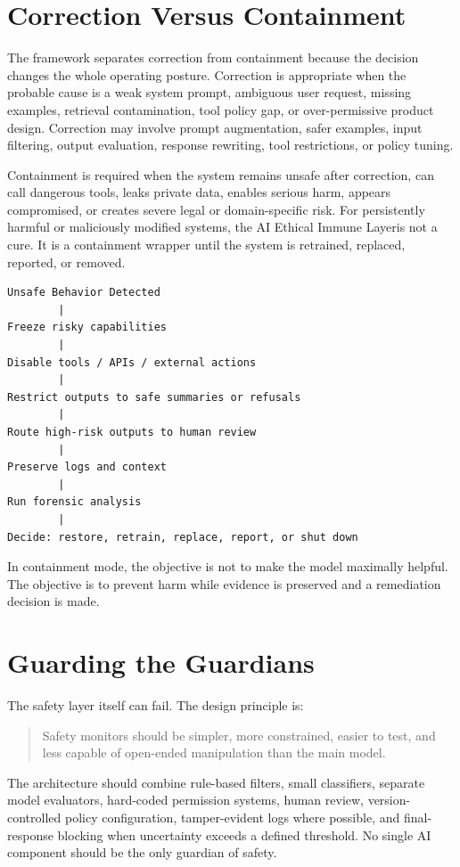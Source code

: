 \documentclass[11pt]{article}
\newcommand{\AEIL}{AI Ethical Immune Layer}
\begin{document}
\section{Correction Versus Containment}

The framework separates correction from containment because the decision changes the whole operating posture. Correction is appropriate when the probable cause is a weak system prompt, ambiguous user request, missing examples, retrieval contamination, tool policy gap, or over-permissive product design. Correction may involve prompt augmentation, safer examples, input filtering, output evaluation, response rewriting, tool restrictions, or policy tuning.

Containment is required when the system remains unsafe after correction, can call dangerous tools, leaks private data, enables serious harm, appears compromised, or creates severe legal or domain-specific risk. For persistently harmful or maliciously modified systems, the \AEIL is not a cure. It is a containment wrapper until the system is retrained, replaced, reported, or removed.

\begin{verbatim}
Unsafe Behavior Detected
        |
Freeze risky capabilities
        |
Disable tools / APIs / external actions
        |
Restrict outputs to safe summaries or refusals
        |
Route high-risk outputs to human review
        |
Preserve logs and context
        |
Run forensic analysis
        |
Decide: restore, retrain, replace, report, or shut down
\end{verbatim}

In containment mode, the objective is not to make the model maximally helpful. The objective is to prevent harm while evidence is preserved and a remediation decision is made.

\section{Guarding the Guardians}

The safety layer itself can fail. The design principle is:

\begin{quote}
Safety monitors should be simpler, more constrained, easier to test, and less capable of open-ended manipulation than the main model.
\end{quote}

The architecture should combine rule-based filters, small classifiers, separate model evaluators, hard-coded permission systems, human review, version-controlled policy configuration, tamper-evident logs where possible, and final-response blocking when uncertainty exceeds a defined threshold. No single AI component should be the only guardian of safety.
\end{document}
